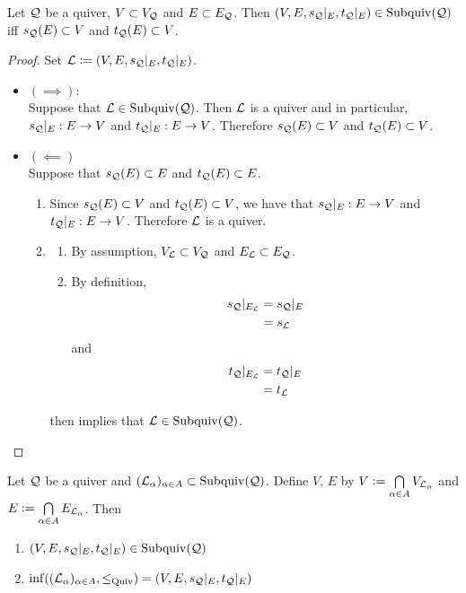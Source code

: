\documentclass{book}
\begin{document}
	\begin{ex}
		Let $\mathcal{Q}$ be a quiver, $V \subset V_{\mathcal{Q}}$ and $E \subset E_{\mathcal{Q}}$. Then $(V, E, s_{\mathcal{Q}}|_E, t_{\mathcal{Q}}|_{E}) \in \operatorname{Subquiv}(\mathcal{Q})$ iff $s_{\mathcal{Q}}(E) \subset V$ and $t_{\mathcal{Q}}(E) \subset V$.
	\end{ex}
	
	\begin{proof}
		Set $\mathcal{L} \vcentcolon= (V, E, s_{\mathcal{Q}}|_E, t_{\mathcal{Q}}|_{E})$.
		\begin{itemize}
			\item $(\implies)$: \\
			Suppose that $\mathcal{L} \in \operatorname{Subquiv}(\mathcal{Q})$. Then $\mathcal{L}$ is a quiver and in particular, $s_{\mathcal{Q}}|_E:E \rightarrow V$ and $t_{\mathcal{Q}}|_E:E \rightarrow V$. Therefore $s_{\mathcal{Q}}(E) \subset V$ and $t_{\mathcal{Q}}(E) \subset V$.
			\item $(\impliedby)$ \\
			Suppose that $s_{\mathcal{Q}}(E) \subset E$ and $t_{\mathcal{Q}}(E) \subset E$. 
			\begin{enumerate}
				\item Since $s_{\mathcal{Q}}(E) \subset V$ and $t_{\mathcal{Q}}(E) \subset V$, we have that $s_{\mathcal{Q}}|_E: E \rightarrow V$ and $t_{\mathcal{Q}}|_E: E \rightarrow V$. Therefore 
				$\mathcal{L}$ is a quiver.
				\item 
				\begin{enumerate}
					\item By assumption, $V_{\mathcal{L}} \subset V_{\mathcal{Q}}$ and $E_{\mathcal{L}} \subset E_{\mathcal{Q}}$.
					\item By definition,  
					\begin{align*}
						s_{\mathcal{Q}}|_{E_{\mathcal{L}}} 
						& = s_{\mathcal{Q}}|_E \\
						& = s_{\mathcal{L}}
					\end{align*}
					and 
					\begin{align*}
						t_{\mathcal{Q}}|_{E_{\mathcal{L}}} 
						& = t_{\mathcal{Q}}|_E \\
						& = t_{\mathcal{L}}
					\end{align*}
				\end{enumerate} 
				 then implies that $\mathcal{L} \in \operatorname{Subquiv}(\mathcal{Q})$.
			\end{enumerate} 
		\end{itemize}
	\end{proof}
	
	\begin{ex}
		Let $\mathcal{Q}$ be a quiver and $(\mathcal{L}_{\alpha})_{\alpha \in A} \subset \operatorname{Subquiv}(\mathcal{Q})$. Define $V$, $E$ by $V \vcentcolon= \bigcap\limits_{\alpha \in A} V_{\mathcal{L}_{\alpha}}$ and $E \vcentcolon= \bigcap\limits_{\alpha \in A} E_{\mathcal{L}_{\alpha}}$. Then 
		\begin{enumerate}
			\item $(V, E, s_{\mathcal{Q}}|_E, t_{\mathcal{Q}}|_E) \in \operatorname{Subquiv}(\mathcal{Q})$
			\item $\inf ((\mathcal{L}_{\alpha})_{\alpha \in A} , \leq_\text{Quiv}) = (V, E, s_{\mathcal{Q}}|_E, t_{\mathcal{Q}}|_E)$
		\end{enumerate}
	\end{ex}
	
\end{document}

